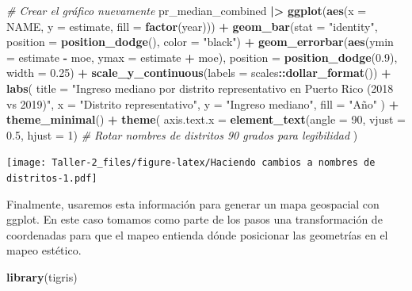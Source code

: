 \documentclass[
]{article}
\newenvironment{Shaded}{\begin{snugshade}}{\end{snugshade}}
\newcommand{\AttributeTok}[1]{\textcolor[rgb]{0.13,0.29,0.53}{#1}}
\newcommand{\CommentTok}[1]{\textcolor[rgb]{0.56,0.35,0.01}{\textit{#1}}}
\newcommand{\DecValTok}[1]{\textcolor[rgb]{0.00,0.00,0.81}{#1}}
\newcommand{\FloatTok}[1]{\textcolor[rgb]{0.00,0.00,0.81}{#1}}
\newcommand{\FunctionTok}[1]{\textcolor[rgb]{0.13,0.29,0.53}{\textbf{#1}}}
\newcommand{\NormalTok}[1]{#1}
\newcommand{\SpecialCharTok}[1]{\textcolor[rgb]{0.81,0.36,0.00}{\textbf{#1}}}
\newcommand{\StringTok}[1]{\textcolor[rgb]{0.31,0.60,0.02}{#1}}
\begin{document}
\begin{Shaded}
\begin{Highlighting}[]
\CommentTok{\# Crear el gráfico nuevamente}
\NormalTok{pr\_median\_combined }\SpecialCharTok{|\textgreater{}}
  \FunctionTok{ggplot}\NormalTok{(}\FunctionTok{aes}\NormalTok{(}\AttributeTok{x =}\NormalTok{ NAME, }\AttributeTok{y =}\NormalTok{ estimate, }\AttributeTok{fill =} \FunctionTok{factor}\NormalTok{(year))) }\SpecialCharTok{+}
  \FunctionTok{geom\_bar}\NormalTok{(}\AttributeTok{stat =} \StringTok{"identity"}\NormalTok{, }\AttributeTok{position =} \FunctionTok{position\_dodge}\NormalTok{(), }\AttributeTok{color =} \StringTok{"black"}\NormalTok{) }\SpecialCharTok{+}
  \FunctionTok{geom\_errorbar}\NormalTok{(}\FunctionTok{aes}\NormalTok{(}\AttributeTok{ymin =}\NormalTok{ estimate }\SpecialCharTok{{-}}\NormalTok{ moe, }\AttributeTok{ymax =}\NormalTok{ estimate }\SpecialCharTok{+}\NormalTok{ moe), }
                \AttributeTok{position =} \FunctionTok{position\_dodge}\NormalTok{(}\FloatTok{0.9}\NormalTok{), }\AttributeTok{width =} \FloatTok{0.25}\NormalTok{) }\SpecialCharTok{+}
  \FunctionTok{scale\_y\_continuous}\NormalTok{(}\AttributeTok{labels =}\NormalTok{ scales}\SpecialCharTok{::}\FunctionTok{dollar\_format}\NormalTok{()) }\SpecialCharTok{+}
  \FunctionTok{labs}\NormalTok{(}
    \AttributeTok{title =} \StringTok{"Ingreso mediano por distrito representativo en Puerto Rico (2018 vs 2019)"}\NormalTok{,}
    \AttributeTok{x =} \StringTok{"Distrito representativo"}\NormalTok{,}
    \AttributeTok{y =} \StringTok{"Ingreso mediano"}\NormalTok{,}
    \AttributeTok{fill =} \StringTok{"Año"}
\NormalTok{  ) }\SpecialCharTok{+}
  \FunctionTok{theme\_minimal}\NormalTok{() }\SpecialCharTok{+}
  \FunctionTok{theme}\NormalTok{(}
    \AttributeTok{axis.text.x =} \FunctionTok{element\_text}\NormalTok{(}\AttributeTok{angle =} \DecValTok{90}\NormalTok{, }\AttributeTok{vjust =} \FloatTok{0.5}\NormalTok{, }\AttributeTok{hjust =} \DecValTok{1}\NormalTok{)  }\CommentTok{\# Rotar nombres de distritos 90 grados para legibilidad}
\NormalTok{  )}
\end{Highlighting}
\end{Shaded}

\texttt{[image: Taller-2\_files/figure-latex/Haciendo cambios a nombres de distritos-1.pdf]}

Finalmente, usaremos esta información para generar un mapa geospacial
con ggplot. En este caso tomamos como parte de los pasos una
transformación de coordenadas para que el mapeo entienda dónde
posicionar las geometrías en el mapeo estético.

\begin{Shaded}
\begin{Highlighting}[]
\FunctionTok{library}\NormalTok{(tigris)}
\end{Highlighting}
\end{Shaded}
\end{document}
